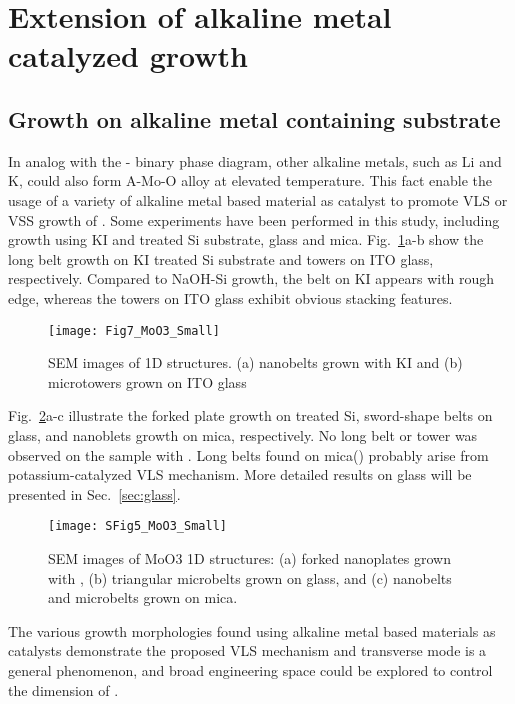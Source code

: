 \section{Extension of alkaline metal catalyzed growth}


\subsection{Growth on alkaline metal containing substrate}

In analog with the - binary phase diagram, other alkaline metals, such as Li and K, could also form A-Mo-O alloy at elevated temperature. This fact enable the usage of a variety of alkaline metal based material as catalyst to promote VLS or VSS growth of . Some experiments have been performed in this study, including growth using KI and  treated Si substrate, glass and mica. Fig.~\ref{fig:ch4al1}a-b show the long belt growth on KI treated Si substrate and towers on ITO glass, respectively. Compared to NaOH-Si growth, the belt on KI appears with rough edge, whereas the towers on ITO glass exhibit obvious stacking features. 

\begin{figure}[htb]
\centering
\texttt{[image: Fig7\_MoO3\_Small]}
\caption[Alternative catalysts for  growth 1]{SEM images of  1D structures. (a) nanobelts grown with KI and (b) microtowers grown on ITO glass}
\label{fig:ch4al1}
\end{figure}

Fig.~\ref{fig:ch4al2}a-c illustrate the forked plate growth on  treated Si, sword-shape belts on glass, and nanoblets growth on mica, respectively. No long belt or tower was observed on the sample with . Long belts found on mica() probably arise from potassium-catalyzed VLS mechanism.\cite{Hu2011} More detailed results on glass will be presented in Sec.~\ref{sec:glass}. 

\begin{figure}[htb]
\centering
\texttt{[image: SFig5\_MoO3\_Small]}
\caption[Alternative catalysts for  growth 2]{SEM images of MoO3 1D structures: (a) forked nanoplates grown with , (b) triangular microbelts grown on glass, and (c) nanobelts and microbelts grown on mica.}
\label{fig:ch4al2}
\end{figure}

The various growth morphologies found using alkaline metal based materials as catalysts demonstrate the proposed VLS mechanism and transverse mode is a general phenomenon, and broad engineering space could be explored to control the dimension of . 

